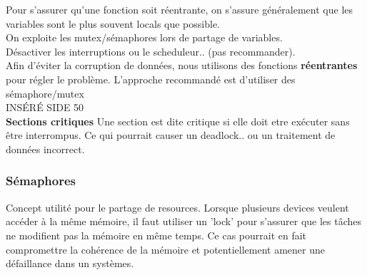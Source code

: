 \documentclass[oneside]{book}
\begin{document}
    Pour s'assurer qu'une fonction soit réentrante, on s'assure généralement que les variables sont le plus souvent locals que possible.\\
    
    On exploite les mutex/sémaphores lors de partage de variables.\\
    
    Désactiver les interruptions ou le scheduleur.. (pas recommander).\\
    
    Afin d'éviter la corruption de données, nous utilisons des fonctions \textbf{réentrantes} pour régler le problème. L'approche recommandé est d'utiliser des sémaphore/mutex\\
    
    INSÉRÉ SIDE 50\\
    
    \textbf{Sections critiques}
    Une section est dite critique si elle doit etre exécuter sans être interrompus. Ce qui pourrait causer un deadlock.. ou un traitement de données incorrect.
    
    \subsubsection{Sémaphores}
    Concept utilité pour le partage de resources. Lorsque plusieurs devices veulent accéder à la même mémoire, il faut utiliser un 'lock' pour s'assurer que les tâches ne modifient pas la mémoire en même temps. Ce cas pourrait en fait compromettre la cohérence de la mémoire et potentiellement amener une défaillance dans un systèmes.\\
    
\end{document}
